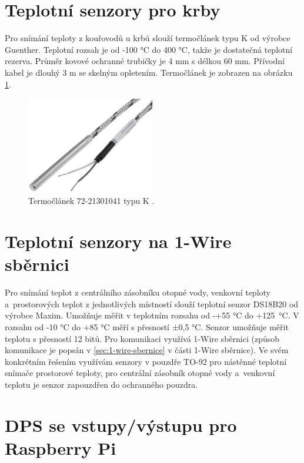\section{Teplotní senzory pro krby}
\label{sec:teplotni-senzory-pro-krby}
Pro snímání teploty z kouřovodů u krbů slouží termočlánek typu K od výrobce Guenther. Teplotní rozsah je od -100 °C do 400 °C, takže je dostatečná teplotní rezerva. Průměr kovové ochranné trubičky je 4 mm s délkou 60 mm. Přívodní kabel je dlouhý 3 m se skelným opletením. Termočlánek je zobrazen na obrázku \ref{fig:termoclanek-72-21301041-k}.

\begin{figure}[H]
    \centering
    \includegraphics[width=0.5\textwidth]{images/termoclanek-72-21301041-k.png}
    \caption{Termočlánek 72-21301041 typu K \cite{termoclanek-k}.}
    \label{fig:termoclanek-72-21301041-k}
\end{figure}

\section{Teplotní senzory na 1-Wire sběrnici}
Pro snímání teplot z centrálního zásobníku otopné vody, venkovní teploty a~prostorových teplot z jednotlivých místností slouží teplotní senzor DS18B20 od výrobce Maxim. Umožňuje měřit
v teplotním rozsahu od -+55 °C do +125~°C. V rozsahu od -10 °C do +85 °C měří s přesností ±0,5 °C. Senzor umožňuje měřit teplotu s přesností 12 bitů. Pro komunikaci využívá 1-Wire sběrnici (způsob komunikace je popsán v \ref{sec:1-wire-sbernice} v části 1-Wire sběrnice). Ve svém konkrétním řešením využívám senzory v pouzdře TO-92 pro nástěnné teplotní snímače prostorové teploty, pro centrální zásobník otopné vody a~venkovní teplotu je senzor zapouzdřen do ochranného pouzdra.


\section{DPS se vstupy/výstupu pro Raspberry Pi}

